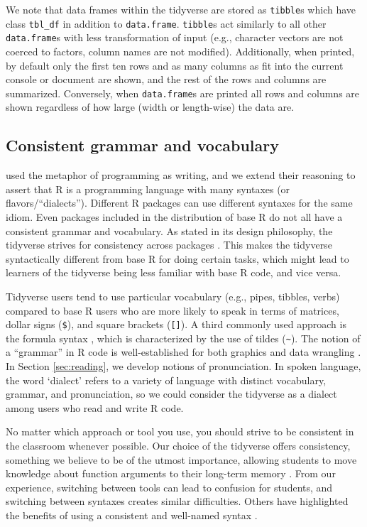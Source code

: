 \documentclass[12pt]{article}
\begin{document}
We note that data frames within the tidyverse are stored as
\texttt{tibble}s which have class \texttt{tbl\_df} in addition to
\texttt{data.frame}. \texttt{tibble}s act similarly to all other
\texttt{data.frame}s with less transformation of input (e.g., character
vectors are not coerced to factors, column names are not modified).
Additionally, when printed, by default only the first ten rows and as
many columns as fit into the current console or document are shown, and
the rest of the rows and columns are summarized. Conversely, when
\texttt{data.frame}s are printed all rows and columns are shown
regardless of how large (width or length-wise) the data are.

\hypertarget{consistent-grammar-and-vocabulary}{%
\subsection{Consistent grammar and
vocabulary}\label{consistent-grammar-and-vocabulary}}

\citet{hermans2017writing} used the metaphor of programming as writing,
and we extend their reasoning to assert that R is a programming language
with many syntaxes (or flavors/``dialects''). Different R packages can
use different syntaxes for the same idiom. Even packages included in the
distribution of base R do not all have a consistent grammar and
vocabulary. As stated in its design philosophy, the tidyverse strives
for consistency across packages \citep{tidyverse-style}. This makes the
tidyverse syntactically different from base R for doing certain tasks,
which might lead to learners of the tidyverse being less familiar with
base R code, and vice versa.

Tidyverse users tend to use particular vocabulary (e.g., pipes, tibbles,
verbs) compared to base R users who are more likely to speak in terms of
matrices, dollar signs (\texttt{\$}), and square brackets
(\texttt{{[}{]}}). A third commonly used approach is the formula syntax
\citep{Pruim2017}, which is characterized by the use of tildes
(\texttt{\textasciitilde{}}). The notion of a ``grammar'' in R code is
well-established for both graphics
\citep{wilkinson2012grammar, R-ggplot2} and data wrangling
\citep{R-dplyr}. In Section \ref{sec:reading}, we develop notions of
pronunciation. In spoken language, the word `dialect' refers to a
variety of language with distinct vocabulary, grammar, and
pronunciation, so we could consider the tidyverse as a dialect among
users who read and write R code.

No matter which approach or tool you use, you should strive to be
consistent in the classroom whenever possible. Our choice of the
tidyverse offers consistency, something we believe to be of the utmost
importance, allowing students to move knowledge about function arguments
to their long-term memory \citep{mcnamaraetal2021a}. From our
experience, switching between tools can lead to confusion for students,
and switching between syntaxes creates similar difficulties. Others have
highlighted the benefits of using a consistent and well-named syntax
\citep{Pruim2017, gehrke2021}.
\end{document}

